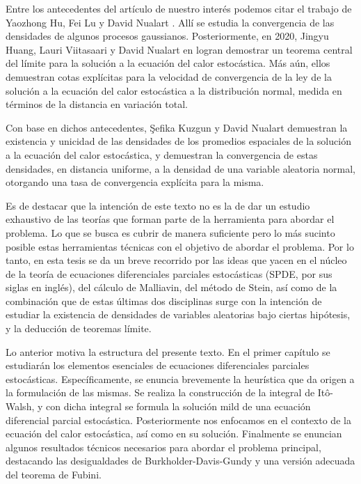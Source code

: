 \documentclass[letterpaper,twoside,12pt]{book}
\newcommand{\1}{\mathds{1}}
\theoremstyle{definition}
\theoremstyle{definition}
\theoremstyle{remark}
\theoremstyle{definition}
\theoremstyle{definition}
\theoremstyle{definition}
\theoremstyle{definition}
\theoremstyle{definition}
\begin{document}
Entre los antecedentes del artículo de nuestro interés \cite{KUZGUN202268} podemos citar el trabajo de Yaozhong Hu, Fei Lu y David Nualart \cite{HU2014814}. Allí se estudia la convergencia de las densidades de algunos procesos gaussianos. Posteriormente, en 2020, Jingyu Huang, Lauri Viitasaari y David Nualart en \cite{HUANG20207170} logran demostrar un teorema central del límite para la solución a la ecuación del calor estocástica. Más aún, ellos demuestran cotas explícitas para la velocidad de convergencia de la ley de la solución a la ecuación del calor estocástica a la distribución normal, medida en términos de la distancia en variación total. 

Con base en dichos antecedentes, \c{S}efika Kuzgun y David Nualart demuestran la existencia y unicidad de las densidades de los promedios espaciales de la solución a la ecuación del calor estocástica, y demuestran la convergencia de estas densidades, en distancia uniforme, a la densidad de una variable aleatoria normal, otorgando una tasa de convergencia explícita para la misma.

Es de destacar que la intención de este texto no es la de dar un estudio exhaustivo de las teorías que forman parte de la herramienta para abordar el problema. Lo que se busca es cubrir de manera suficiente pero lo más sucinto posible estas herramientas técnicas con el objetivo de abordar el problema. Por lo tanto, en esta tesis se da un breve recorrido por las ideas que yacen en el núcleo de la teoría de ecuaciones diferenciales parciales estocásticas (SPDE, por sus siglas en inglés), del cálculo de Malliavin, del método de Stein, así como de la combinación que de estas últimas dos disciplinas surge con la intención de estudiar la existencia de densidades de variables aleatorias bajo ciertas hipótesis, y la deducción de teoremas límite. 

Lo anterior motiva la estructura del presente texto. En el primer capítulo se estudiarán los elementos esenciales de ecuaciones diferenciales parciales estocásticas. Específicamente, se enuncia brevemente la heurística que da origen a la formulación de las mismas. Se realiza la construcción de la integral de Itô-Walsh, y con dicha integral se formula la solución mild de una ecuación diferencial parcial estocástica. Posteriormente nos enfocamos en el contexto de la ecuación del calor estocástica, así como en su solución. Finalmente se enuncian algunos resultados técnicos necesarios para abordar el problema principal, destacando las desigualdades de Burkholder-Davis-Gundy y una versión adecuada del teorema de Fubini.
\end{document}
